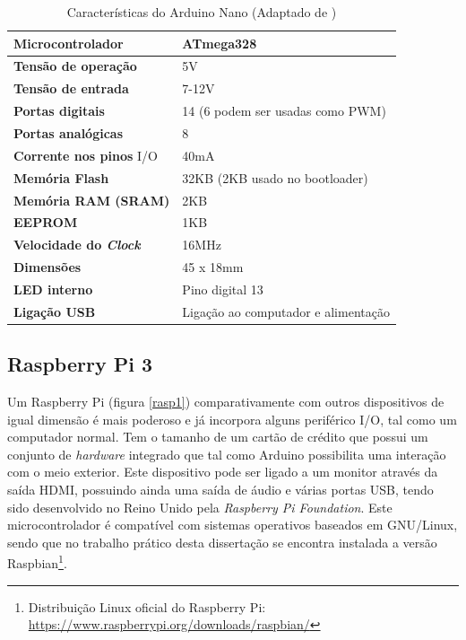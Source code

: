 \begin{table}[h]
	\centering
	
	\begin{tabular}{|
			>{\columncolor[HTML]{EFEFEF}}l |l|} \hline
		\textbf{Microcontrolador} & ATmega328 \\ \hline
		\textbf{Tensão de operação} & 5V \\ \hline
		\textbf{Tensão de entrada} & 7-12V \\ \hline
		\textbf{Portas digitais} & 14 (6 podem ser usadas como PWM) \\ \hline
		\textbf{Portas analógicas} & 8 \\ \hline
		\textbf{Corrente nos pinos} \ac{I/O} & 40mA \\ \hline
		\textbf{Memória Flash} & 32KB (2KB usado no bootloader) \\ \hline
		\textbf{Memória \acs{RAM} (SRAM)} & 2KB \\ \hline
		\textbf{EEPROM} & 1KB \\ \hline
		\textbf{Velocidade do \textit{Clock}} & 16MHz \\ \hline
		\textbf{Dimensões} & 45 x 18mm \\ \hline
		\textbf{\ac{LED} interno} & Pino digital 13 \\ \hline
		\textbf{Ligação \ac{USB}} & Ligação ao computador e alimentação \\ \hline
	\end{tabular}
	\caption[Características do Arduino Nano]{Características do Arduino Nano (Adaptado de \cite{Melorose2015})}
	\label{caraarduino}
\end{table}






\subsection{Raspberry Pi 3}

Um Raspberry Pi (figura \ref{rasp1}) comparativamente com outros dispositivos de igual dimensão é mais poderoso e já incorpora alguns periférico \ac{I/O}, tal como um computador normal. Tem o tamanho de um cartão de crédito que possui um conjunto de \textit{hardware} integrado que tal como Arduino possibilita uma interação com o meio exterior. Este dispositivo pode ser ligado a um monitor através da saída HDMI, possuindo ainda uma saída de áudio e várias portas \ac{USB}, tendo sido desenvolvido no Reino Unido pela \textit{Raspberry Pi Foundation}. Este microcontrolador é compatível com sistemas operativos baseados em GNU/Linux, sendo que no trabalho prático desta dissertação se encontra instalada a versão Raspbian\footnote{Distribuição Linux oficial do Raspberry Pi:  \url{https://www.raspberrypi.org/downloads/raspbian/}}\cite{RaspberryPiFoundation2012}. 




